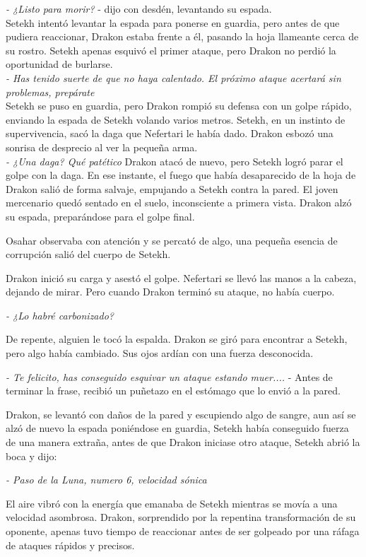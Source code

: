 \textit{- ¿Listo para morir?} - dijo con desdén, levantando su espada.\\
Setekh intentó levantar la espada para ponerse en guardia, pero antes de que pudiera reaccionar, Drakon estaba frente a él, pasando la hoja llameante cerca de su rostro. Setekh apenas esquivó el primer ataque, pero Drakon no perdió la oportunidad de burlarse.\\
\textit{- Has tenido suerte de que no haya calentado. El próximo ataque acertará sin problemas, prepárate}\\
Setekh se puso en guardia, pero Drakon rompió su defensa con un golpe rápido, enviando la espada de Setekh volando varios metros. Setekh, en un instinto de supervivencia, sacó la daga que Nefertari le había dado. Drakon esbozó una sonrisa de desprecio al ver la pequeña arma.\\
\textit{- ¿Una daga? Qué patético}
Drakon atacó de nuevo, pero Setekh logró parar el golpe con la daga. En ese instante, el fuego que había desaparecido de la hoja de Drakon salió de forma salvaje, empujando a Setekh contra la pared. El joven mercenario quedó sentado en el suelo, inconsciente a primera vista. Drakon alzó su espada, preparándose para el golpe final.

Osahar observaba con atención y se percató de algo, una pequeña esencia de corrupción salió del cuerpo de Setekh.

Drakon inició su carga y asestó el golpe. Nefertari se llevó las manos a la cabeza, dejando de mirar. Pero cuando Drakon terminó su ataque, no había cuerpo.

\textit{- ¿Lo habré carbonizado?}

De repente, alguien le tocó la espalda. Drakon se giró para encontrar a Setekh, pero algo había cambiado. Sus ojos ardían con una fuerza desconocida.

\textit{- Te felicito, has conseguido esquivar un ataque estando muer....} - Antes de terminar la frase, recibió un puñetazo en el estómago que lo envió a la pared.

Drakon, se levantó con daños de la pared y escupiendo algo de sangre, aun así se alzó de nuevo la espada poniéndose en guardia, Setekh había conseguido fuerza de una manera extraña, antes de que Drakon iniciase otro ataque, Setekh abrió la boca y dijo:

\textit{- Paso de la Luna, numero 6, velocidad sónica}

El aire vibró con la energía que emanaba de Setekh mientras se movía a una velocidad asombrosa. Drakon, sorprendido por la repentina transformación de su oponente, apenas tuvo tiempo de reaccionar antes de ser golpeado por una ráfaga de ataques rápidos y precisos.

